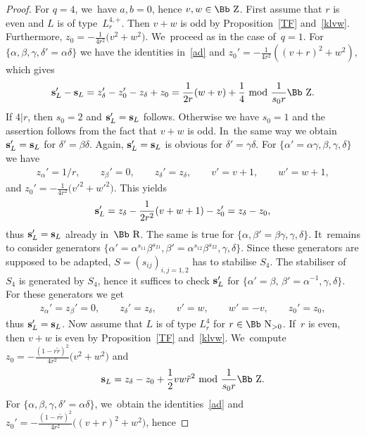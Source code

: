 \documentclass[pdftex]{sigma}
\newcommand\RR{{\mbox{\Bb R}}}
\newcommand\NN{{\mbox{\Bb N}}}
\newcommand\ZZ{{\mbox{\Bb Z}}}
\newcommand\bs{\textbf{{\rm \textbf{s}}}}
\numberwithin{equation}{section}
\begin{document}
\begin{proof}
For $q=4$, we~have $a,b=0$, hence $v,w\in\ZZ$. First assume that $r$ is even and $L$ is of type~$L_r^{4,+}$. Then $v+w$ is odd by Proposition~\ref{TF} and~\eqref{klvw}. Furthermore, $z_0=-\frac1{4r^2}\big(v^2+w^2\big)$. We~proceed as in the case of~$q=1$. For $\{\alpha,\beta,\gamma,\delta'=\alpha\delta\}$ we have the identities in~\eqref{ad} and $z_0'=-\frac1{4r^2}((v+r)^2+w^2)$, which gives
\begin{gather*}
\bs_L'-\bs_L=z_\delta'-z_0'-z_\delta+z_0=\frac1{2r} (w+v)+\frac14\ {\rm mod}\ \frac{1}{s_0r}\ZZ.
\end{gather*}
If $4|r$, then $s_0=2$ and $\bs_L'=\bs_L$ follows. Otherwise we have $s_0=1$ and the assertion follows from the fact that $v+w$ is odd. In~the same way we obtain~$\bs_L'=\bs_L$ for $\delta'=\beta\delta$. Again, $\bs_L'=\bs_L$ is obvious for $\delta'=\gamma\delta$. For $\{\alpha'=\alpha\gamma,\beta,\gamma,\delta\}$ we have
\begin{gather}\label{eo2}
z_\alpha'= 1/r,\qquad z_\beta'=0,\qquad z_\delta'= z_\delta,\qquad v'=v+1,\qquad w'=w+1,
\end{gather}
and $z_0'=-\frac1{4r^2}\big(v'^2+w'^2\big)$. This yields
\begin{gather*}
\bs_L'=z_\delta-\frac 1{2r^2}(v+w+1)-z_0'=z_\delta-z_0,
\end{gather*}
thus $\bs_L'=\bs_L$ already in~$\RR$. The same is true for $\{\alpha,\beta'=\beta\gamma,\gamma,\delta\}$. It~remains to consider generators $\big\{\alpha'=\alpha^{s_{11}}\beta^{s_{21}}, \beta'=\alpha^{s_{12}}\beta^{s_{22}}, \gamma, \delta \big\}$. Since these generators are supposed to be adapted, $S=(s_{ij})_{i,j=1,2}$ has to stabilise $S_4$. The stabiliser of~$S_4$ is generated by $S_4$, hence it suffices to check $\bs_L'$ for $\big\{\alpha'=\beta,\, \beta'=\alpha^{-1},\gamma,\delta\big\}$. For these generators we get
\begin{gather}\label{eo3}
 z_\alpha'= z_\beta'=0,\qquad z_\delta'= z_\delta,\qquad v'=w,\qquad w'=-v,\qquad z_0'=z_0,
\end{gather}
thus $\bs_L'=\bs_L$. Now assume that $L$ is of type $L_r^{4}$ for $r\in\NN_{>0}$. If~$r$ is even, then $v+w$ is even by Proposition~\ref{TF} and~\eqref{klvw}. We~compute $z_0=-\frac{(1-r\tilde r)^2}{4r^2}\big(v^2+w^2\big)$ and
\begin{gather*}
\bs_L=z_\delta-z_0+\frac{1}{2}vw\tilde r^2\ {\rm mod}\ \frac{1}{s_0r}\ZZ.
\end{gather*}
For $\{\alpha,\beta,\gamma,\delta'=\alpha\delta\}$, we~obtain the identities~\eqref{ad} and $z_0'=-\frac{(1-r\tilde r)^2}{4r^2}\big((v+r)^2+w^2\big)$, hence

\end{proof}
\end{document}
